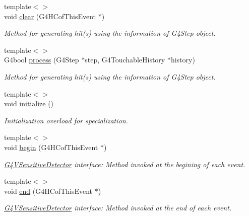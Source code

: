 \begin{DoxyCompactItemize}
{\footnotesize template$<$$>$ }\\void \hyperlink{class_d_d4hep_1_1_simulation_1_1_geant4_sensitive_action_ad6662339c480efeb52af63c13fe6cc88}{clear} (G4\+H\+Cof\+This\+Event $\ast$)
\begin{DoxyCompactList}\small\item\em Method for generating hit(s) using the information of G4\+Step object. \end{DoxyCompactList}\item 
{\footnotesize template$<$$>$ }\\G4bool \hyperlink{class_d_d4hep_1_1_simulation_1_1_geant4_sensitive_action_a0788632157d0928128a95e0cead244db}{process} (G4\+Step $\ast$step, G4\+Touchable\+History $\ast$history)
\begin{DoxyCompactList}\small\item\em Method for generating hit(s) using the information of G4\+Step object. \end{DoxyCompactList}\item 
{\footnotesize template$<$$>$ }\\void \hyperlink{class_d_d4hep_1_1_simulation_1_1_geant4_sensitive_action_abbda4901e215cc296b7769ed9893d6de}{initialize} ()
\begin{DoxyCompactList}\small\item\em Initialization overload for specialization. \end{DoxyCompactList}\item 
{\footnotesize template$<$$>$ }\\void \hyperlink{class_d_d4hep_1_1_simulation_1_1_geant4_sensitive_action_a601b872018378ba77a1573f4458b61e1}{begin} (G4\+H\+Cof\+This\+Event $\ast$)
\begin{DoxyCompactList}\small\item\em \hyperlink{class_g4_v_sensitive_detector}{G4\+V\+Sensitive\+Detector} interface\+: Method invoked at the begining of each event. \end{DoxyCompactList}\item 
{\footnotesize template$<$$>$ }\\void \hyperlink{class_d_d4hep_1_1_simulation_1_1_geant4_sensitive_action_a9847064b0c71d72bc079dcc4ff00b64f}{end} (G4\+H\+Cof\+This\+Event $\ast$)
\begin{DoxyCompactList}\small\item\em \hyperlink{class_g4_v_sensitive_detector}{G4\+V\+Sensitive\+Detector} interface\+: Method invoked at the end of each event. \end{DoxyCompactList}\item 

\end{DoxyCompactItemize}
